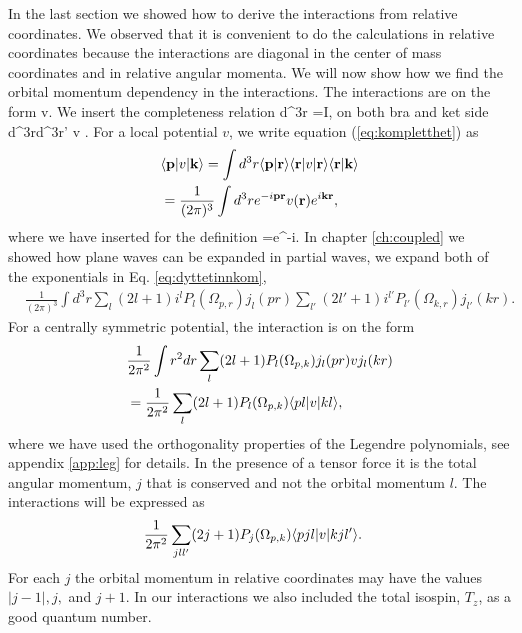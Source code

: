 In the last section we showed how to derive the interactions from relative coordinates. We observed that it is convenient to do the calculations in relative coordinates because the interactions are diagonal in the center of mass coordinates and in relative angular momenta. We will now show how we find the orbital momentum dependency in the interactions. 
The interactions are on the form
\beq
		v\notag.		
\eeq
We insert the completeness relation 
\beq
\int d^3r =I,
\eeq
on both bra and ket side
\be
\int d^3r\int d^3r' v .
\label{eq:kompletthet}
\ee
For a local potential $v$, we write equation (\eqref{eq:kompletthet}) as
\begin{align}
	&	\bra{\bold p}v\ket{\bold k}=\int d^3r \braket{\bold p}{\bold r}\bra{\bold r}v\ket{\bold r}\braket{\bold r}{\bold k}\notag\\
	&=\frac{1}{(2\pi)^3}\int d^3re^{-i\bold p \bold r}v(\bold r)e^{i\bold{kr}},
	\label{eq:dyttetinnkom}
\end{align}
where we have inserted for the definition
\beq
{}=e^{-i}.
\eeq
In chapter \ref{ch:coupled} we showed how plane waves can be expanded in partial waves, we expand  both of the exponentials
in Eq. \eqref{eq:dyttetinnkom},
\begin{align}
		&\frac{1}{(2\pi)^3}\int d^3r \sum_l (2 l + 1 ) i^l P_l(\Omega_{p,r}) j_l(pr) \sum_{l'} (2 l' + 1 ) i^{l'} P_{l'}(\Omega_{k,r}) j_{l'}(kr).
		\label{eq:soonpotential}
\end{align}
For a centrally symmetric potential, the interaction is on the form
\begin{align}
	&	\frac{1}{2\pi^2}\int r^2dr\sum_l (2 l +  1 ) P_l(\Omega_{p,k}) j_l(pr)vj_l(kr)\notag \\
		&=\frac{1}{2\pi^2}\sum_l (2 l +  1 ) P_l(\Omega_{p,k})\bra{pl}v\ket{kl}, 
		\label{eq:vrl}
\end{align}
where we have used the orthogonality properties of the Legendre polynomials, see appendix \ref{app:leg} for details.
In the presence of a tensor force it is the total angular momentum, $j$ that is conserved and not the orbital momentum 
$l$. The interactions will be expressed as
\begin{align}
		&\frac{1}{2\pi^2}\sum_{jll'} (2 j +  1 ) P_j(\Omega_{p,k})\bra{pjl}v\ket{kjl'}.
			\label{eq:vrlj}
\end{align}
For each $j$ the orbital momentum in relative coordinates may have the values $|j-1|,j,$ and $j+1$. 
In our interactions we also included the total isospin, $T_z$, as a good quantum number.
